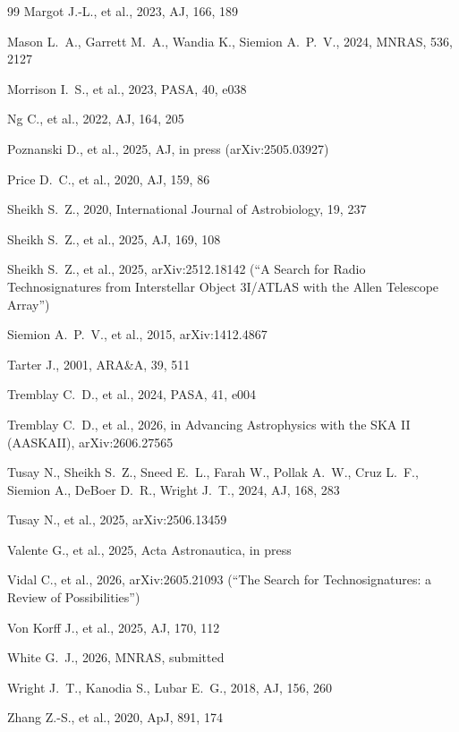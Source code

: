 \documentclass{openjournal}
\begin{document}
\begin{thebibliography}{99}
 Margot J.-L., et al., 2023, AJ, 166, 189

 Mason L.~A., Garrett M.~A., Wandia K., Siemion A.~P.~V., 2024, MNRAS, 536, 2127

 Morrison I.~S., et al., 2023, PASA, 40, e038

 Ng C., et al., 2022, AJ, 164, 205

 Poznanski D., et al., 2025, AJ, in press (arXiv:2505.03927)

 Price D.~C., et al., 2020, AJ, 159, 86

 Sheikh S.~Z., 2020, International Journal of Astrobiology, 19, 237

 Sheikh S.~Z., et al., 2025, AJ, 169, 108

 Sheikh S.~Z., et al., 2025, arXiv:2512.18142 (``A Search for Radio Technosignatures from Interstellar Object 3I/ATLAS with the Allen Telescope Array'')

 Siemion A.~P.~V., et al., 2015, arXiv:1412.4867

 Tarter J., 2001, ARA\&A, 39, 511

 Tremblay C.~D., et al., 2024, PASA, 41, e004

 Tremblay C.~D., et al., 2026, in Advancing Astrophysics with the SKA II (AASKAII), arXiv:2606.27565

 Tusay N., Sheikh S.~Z., Sneed E.~L., Farah W., Pollak A.~W., Cruz L.~F., Siemion A., DeBoer D.~R., Wright J.~T., 2024, AJ, 168, 283

 Tusay N., et al., 2025, arXiv:2506.13459

 Valente G., et al., 2025, Acta Astronautica, in press

 Vidal C., et al., 2026, arXiv:2605.21093 (``The Search for Technosignatures: a Review of Possibilities'')

 Von Korff J., et al., 2025, AJ, 170, 112

 White G.~J., 2026, MNRAS, submitted

 Wright J.~T., Kanodia S., Lubar E.~G., 2018, AJ, 156, 260

 Zhang Z.-S., et al., 2020, ApJ, 891, 174

\end{thebibliography}
\end{document}
